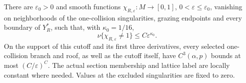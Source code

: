 \begin{lemma}\label{lem:uniform-collision-cutoff}
There are $\varepsilon_0>0$ and smooth functions
$\chi_{R,\varepsilon}:M\to[0,1]$, $0<\varepsilon\le\varepsilon_0$,
vanishing on neighborhoods of the one-collision singularities, grazing
endpoints and every boundary of $Y_R^*$, such that, with $\kappa_0=1/16$,
\begin{equation}\label{eq:collision-cutoff-measure}
 \nu\{\chi_{R,\varepsilon}\ne1\}\le C\varepsilon^{\kappa_0}.
\end{equation}
On the support of this cutoff and its first three derivatives, every
selected one-collision branch and roof, as well as the cutoff itself,
have $C^3(\alpha,p)$ bounds at most $(C/\varepsilon)^C$.
The actual section membership and lattice label are locally constant
where needed. Values at the excluded singularities are fixed to zero.
\end{lemma}
